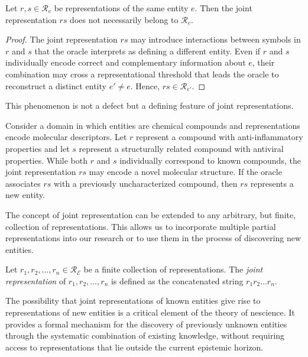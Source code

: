 \begin{proposition}
Let $r,s \in \mathcal{R}_e$ be representations of the same entity $e$. Then the joint representation $rs$ does not necessarily belong to $\mathcal{R}_e$.
\end{proposition}

\begin{proof}
The joint representation $rs$ may introduce interactions between symbols in $r$ and $s$ that the oracle interprets as defining a different entity. Even if $r$ and $s$ individually encode correct and complementary information about $e$, their combination may cross a representational threshold that leads the oracle to reconstruct a distinct entity $e' \neq e$. Hence, $rs \in \mathcal{R}_{e'}$.
\end{proof}

This phenomenon is not a defect but a defining feature of joint representations.

\begin{example}
Consider a domain in which entities are chemical compounds and representations encode molecular descriptors. Let $r$ represent a compound with anti-inflammatory properties and let $s$ represent a structurally related compound with antiviral properties. While both $r$ and $s$ individually correspond to known compounds, the joint representation $rs$ may encode a novel molecular structure. If the oracle associates $rs$ with a previously uncharacterized compound, then $rs$ represents a new entity.
\end{example}

The concept of joint representation can be extended to any arbitrary, but finite, collection of representations. This allows us to incorporate multiple partial representations into our research or to use them in the process of discovering new entities.

\begin{definition}
Let $r_1, r_2, \ldots, r_n \in \mathcal{R}_\mathcal{E}$ be a finite collection of representations. The \emph{joint representation} of $r_1, r_2, \ldots, r_n$ is defined as the concatenated string $r_1 r_2 \ldots r_n$.
\end{definition}

The possibility that joint representations of known entities give rise to representations of new entities is a critical element of the theory of nescience. It provides a formal mechanism for the discovery of previously unknown entities through the systematic combination of existing knowledge, without requiring access to representations that lie outside the current epistemic horizon.

